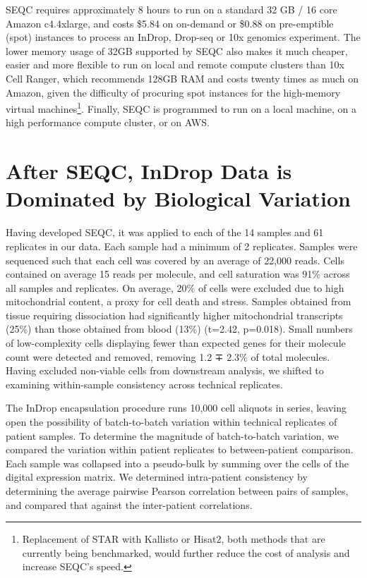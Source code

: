 SEQC requires approximately 8 hours to run on a standard 32 GB / 16 core Amazon c4.4xlarge, and costs \$5.84 on on-demand or \$0.88 on pre-emptible (spot) instances to process an InDrop, Drop-seq or 10x genomics experiment.
The lower memory usage of 32GB supported by SEQC also makes it much cheaper, easier and more flexible to run on local and remote compute clusters than 10x Cell Ranger, which recommends 128GB RAM and costs twenty times as much on Amazon, given the difficulty of procuring spot instances for the high-memory virtual machines\footnote{Replacement of STAR with Kallisto or Hisat2, both methods that are currently being benchmarked, would further reduce the cost of analysis and increase SEQC's speed.}. 
Finally, SEQC is programmed to run on a local machine, on a high performance compute cluster, or on AWS. 


\section{After SEQC, InDrop Data is Dominated by Biological Variation}

Having developed SEQC, it was applied to each of the 14 samples and 61 replicates in our data. 
Each sample had a minimum of 2 replicates.  %
Samples were sequenced such that each cell was covered by an average of 22,000 reads.
Cells contained on average 15 reads per molecule, and cell saturation was 91\% across all samples and replicates. 
On average, 20\% of cells were excluded due to high mitochondrial content, a proxy for cell death and stress. 
Samples obtained from tissue requiring dissociation had significantly higher mitochondrial transcripts (25\%) than those obtained from blood (13\%) (t=2.42, p=0.018). 
Small numbers of low-complexity cells displaying fewer than expected genes for their molecule count were detected and removed, removing 1.2 ∓ 2.3\% of total molecules. 
Having excluded non-viable cells from downstream analysis, we shifted to examining within-sample consistency across technical replicates.

The InDrop encapsulation procedure runs 10,000 cell aliquots in series, leaving open the possibility of batch-to-batch variation within technical replicates of patient samples. 
To determine the magnitude of batch-to-batch variation, we compared the variation within patient replicates to between-patient comparison. 
Each sample was collapsed into a pseudo-bulk by summing over the cells of the digital expression matrix. 
We determined intra-patient consistency by determining the average pairwise Pearson correlation between pairs of samples, and compared that against the inter-patient correlations. 

